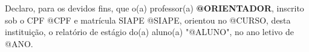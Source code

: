


\hspace{1.4cm}


\vspace{1.5cm}



\vspace{2cm}

Declaro, para os devidos fins, que o(a) professor(a) {\bf @ORIENTADOR}, inscrito sob o CPF @CPF e matrícula SIAPE @SIAPE, orientou no @CURSO, desta instituição, o relatório de estágio do(a) aluno(a) "@ALUNO", no ano letivo de @ANO.

\vspace{2cm}



